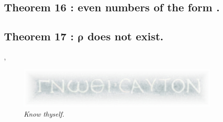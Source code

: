 \documentclass[preview]{standalone}
\begin{document}
\subsection[\texorpdfstring{Even numbers of the form $3 \gamma + 2$}
        {Even numbers of the form $3 gamma + 2$}
    ]{
        \color{section} Theorem 16 \color{black} : even numbers of the form .
    }

\pagebreak


\subsection[\texorpdfstring{$\rho$ does not exist.}
        {Rho does not exist.}
    ]{
        \color{section} Theorem 17 \color{black} : $\bm{\rho}$ does not exist.
    }

\sep
\begin{figure}[h!]
    \centering
    \includegraphics[width=10cm]{../resources/jpg/1.6.introduction.to.proofs/know_thyself.jpg}
    \caption*{\emph{Know thyself.}}
\end{figure} 
\pagebreak
\thispagestyle{empty}
\end{document}
